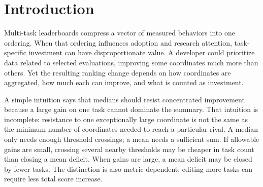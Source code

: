 \documentclass{article}
\begin{document}
\printAffiliationsAndNotice{}
\begin{abstract}
How many task scores must a developer improve to make a particular model first on a multi-task leaderboard? We study bounded, upward-only score interventions, explicitly not a model of training cost, under mean, median, and Borda aggregation. Monotonicity reduces minimum edited-task count to endpoint subset selection; threshold crossings characterize odd medians, while integer margin constraints account for both target gains and displaced Borda rivals. Experiments on fixed public matrices from HELM MMLU (79 models, 57 subjects) and Open LLM (4,576 configurations, six tasks) show that attainability and conditional edit count must be reported separately. For shared first, median needs fewer edits than mean on average at half-headroom ceilings but more on average at full-headroom ceilings on fixed jointly feasible nonwinner cohorts; for 64 of 77 HELM nonwinners, median nevertheless requires less total score gain despite editing more tasks. These results establish conditional rather than universal aggregation comparisons, with reproducible witnesses, numerical audits, and sensitivity analyses for ties, scaling, and competitor composition.
\end{abstract}

\section{Introduction}
Multi-task leaderboards compress a vector of measured behaviors into one ordering. When that ordering influences adoption and research attention, task-specific investment can have disproportionate value. A developer could prioritize data related to selected evaluations, improving some coordinates much more than others. Yet the resulting ranking change depends on how coordinates are aggregated, how much each can improve, and what is counted as investment.

A simple intuition says that medians should resist concentrated improvement because a large gain on one task cannot dominate the summary. That intuition is incomplete: resistance to one exceptionally large coordinate is not the same as the minimum number of coordinates needed to reach a particular rival. A median only needs enough threshold crossings; a mean needs a sufficient sum. If allowable gains are small, crossing several nearby thresholds may be cheaper in task count than closing a mean deficit. When gains are large, a mean deficit may be closed by fewer tasks. The distinction is also metric-dependent: editing more tasks can require less total score increase.
\end{document}

